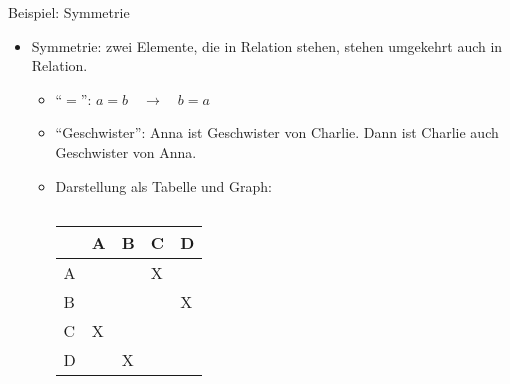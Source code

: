 \begin{frame}{Beispiel: Symmetrie}
	\begin{itemize}
		\item Symmetrie: zwei Elemente, die in Relation stehen, stehen umgekehrt auch in Relation.
		\begin{itemize}
			\item "`$=$"': $a=b\quad\rightarrow\quad b=a$
			\item "`Geschwister"': Anna ist Geschwister von Charlie. Dann ist Charlie auch Geschwister von Anna.
			\item Darstellung als Tabelle und Graph:\\
			\vspace{1em}
			\begin{columns}
				\begin{tabularx}{\textwidth}{|Y|Y|Y|Y|Y|}
					\hline
					& A & B & C & D \\
					\hline
					A &  &  & X &  \\
					\hline
					B &  &  &  & X \\
					\hline
					C & X &  &  &  \\
					\hline
					D &  & X &  &  \\
					\hline
				\end{tabularx}
			\end{columns}
		\end{itemize}
	\end{itemize}	
\end{frame}

